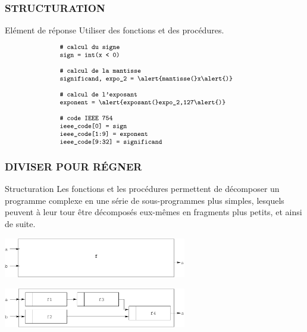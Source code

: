\begin{frame}
\frametitle{\uppercase{Structuration}}
\begin{block}{Elément de réponse}
Utiliser des fonctions et des procédures.
\end{block}

$$\begin{minipage}{8cm}\footnotesize\tt
\# calcul du signe\\
sign = int(x < 0)\\
\mbox{}\\ 
\# calcul de la mantisse\\
significand, expo\_2 = \alert{mantisse(}x\alert{)}\\
\mbox{}\\ 
\# calcul de l'exposant\\
exponent = \alert{exposant(}expo\_2,127\alert{)}\\
\mbox{}\\
\# code IEEE 754\\
ieee\_code[0] = sign\\
ieee\_code[1:9] = exponent\\
ieee\_code[9:32] = significand
\end{minipage}$$
    
\end{frame}

\begin{frame}
\frametitle{\uppercase{Diviser pour régner}}
\begin{block}{Structuration}
Les fonctions et les procédures permettent de décomposer un programme complexe en une 
série de sous-programmes plus simples, lesquels peuvent à leur tour être décomposés 
eux-mêmes en fragments plus petits, et ainsi de suite.  
\end{block}

\centerline{\includegraphics[width=8cm]{structure1.pdf}}

\centerline{\includegraphics[width=8cm]{structure2.pdf}}

\end{frame}
\note{} 


